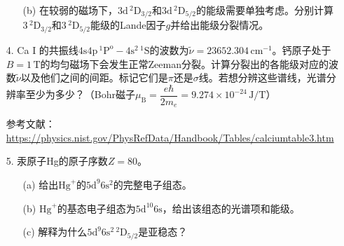 \documentclass[a4paper]{article}
\begin{document}
\begin{enumerate}
\begin{enumerate}
        \item[(b)] 在较弱的磁场下，$\mathrm{3d\,^2D}_{3/2}$和$\mathrm{3d\,^2D}_{5/2}$的能级需要单独考虑。分别计算$3\,^2\mathrm{D}_{3/2}$和$3\,^2\mathrm{D}_{5/2}$能级的Lande因子$g$并给出能级分裂情况。
    \end{enumerate}

    \bigskip
    \item[4.]
    Ca I 的共振线$\mathrm{4s4p\,^1P^o}-\mathrm{4s^2\,^1S}$的波数为$\tilde{\nu}=23652.304\,\mathrm{cm}^{−1}$。钙原子处于$B=1\,\mathrm{T}$的均匀磁场下会发生正常Zeeman分裂。计算分裂出的各能级对应的波数$\tilde{\nu}$以及他们之间的间距。标记它们是$\pi$还是$\sigma$线。若想分辨这些谱线，光谱分辨率至少为多少？（Bohr磁子$\mu_\mathrm{B}=\dfrac{e\hbar}{2m_e}=9.274\times10^{-24}\,\mathrm{J/T}$）

    参考文献：\url{https://physics.nist.gov/PhysRefData/Handbook/Tables/calciumtable3.htm}

    \bigskip
    \item[5.]
    汞原子Hg的原子序数$Z=80$。
    \begin{enumerate}
        \item[(a)]
        给出$\mathrm{Hg}^+$的$\mathrm{5d^9 6s^2}$的完整电子组态。

        \item[(b)]
        $\mathrm{Hg}^+$的基态电子组态为$\mathrm{5d^{10} 6s}$，给出该组态的光谱项和能级。

        \item[(c)]
        解释为什么$\mathrm{5d^9 6s^2\,^2D_{5/2}}$是亚稳态？
    \end{enumerate}
\end{enumerate}
\end{document}

